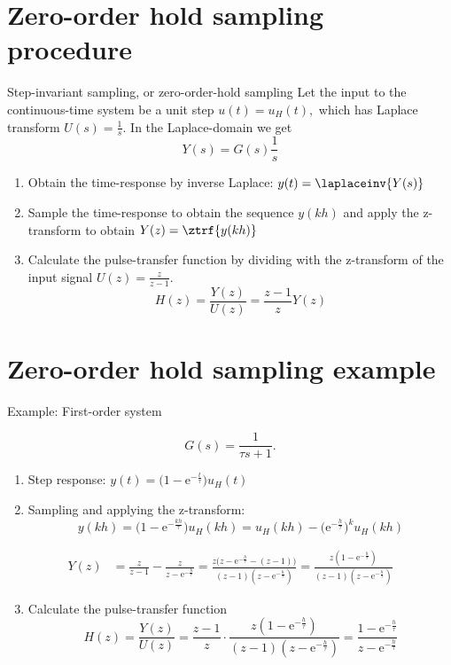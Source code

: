 \documentclass[presentation,aspectratio=169]{beamer}
\begin{document}
\section{Zero-order hold sampling procedure}
\label{sec:org2d54a62}
\begin{frame}[label={sec:org621b033}]{Step-invariant sampling, or zero-order-hold sampling}
Let the input to the continuous-time system be a unit step \(u(t)=u_H(t),\) which has Laplace transform \(U(s)=\frac{1}{s}.\) In the Laplace-domain we get
\[Y(s) = G(s)\frac{1}{s}\]
\begin{enumerate}
\item Obtain the time-response by inverse Laplace: \(y(t)=\laplaceinv{Y(s)}\)
\item Sample the time-response to obtain the sequence \(y(kh)\) and apply  the z-transform to obtain \(Y(z) = \ztrf{y(kh)}\)
\item Calculate the pulse-transfer function by dividing with the z-transform of the input signal \(U(z) = \frac{z}{z-1}.\) \[H(z) = \frac{Y(z)}{U(z)} = \frac{z-1}{z}Y(z) \]
\end{enumerate}
\end{frame}

\section{Zero-order hold sampling example}
\label{sec:org6e294e7}
\begin{frame}[label={sec:org65721d7}]{Example: First-order system}
\small

\[ G(s) = \frac{1}{\tau s + 1}. \]

\pause
\begin{enumerate}
\item Step response: \(y(t) = \big(1 - \mathrm{e}^{-\frac{t}{\tau}}\big)u_H(t)\)
\end{enumerate}
\pause
\begin{enumerate}
\setcounter{enumi}{1}
\item Sampling and applying the z-transform:
\[ y(kh) = \big(1 - \mathrm{e}^{-\frac{kh}{\tau}}\big)u_H(kh) = u_H(kh) - \big(\mathrm{e}^{-\frac{h}{\tau}}\big)^k u_H(kh) \]
\end{enumerate}
\pause
\begin{align*} Y(z) &= \frac{z}{z-1} - \frac{z}{z-\mathrm{e}^{-\frac{h}{\tau}}} = \frac{z\big(z-\mathrm{e}^{-\frac{h}{\tau}} - (z-1)\big)}{(z-1)(z-\mathrm{e}^{-\frac{h}{\tau}})}
= \frac{z(1-\mathrm{e}^{-\frac{h}{\tau}})}{(z-1)(z-\mathrm{e}^{-\frac{h}{\tau}})}
\end{align*}
\pause
\begin{enumerate}
\setcounter{enumi}{2}
\item Calculate the pulse-transfer function
\[H(z) = \frac{Y(z)}{U(z)} = \frac{z-1}{z} \cdot \frac{z(1-\mathrm{e}^{-\frac{h}{\tau}})}{(z-1)(z-\mathrm{e}^{-\frac{h}{\tau}})} = \frac{1-\mathrm{e}^{-\frac{h}{\tau}}}{z-\mathrm{e}^{-\frac{h}{\tau}}} \]
\end{enumerate}
\end{frame}
\end{document}
